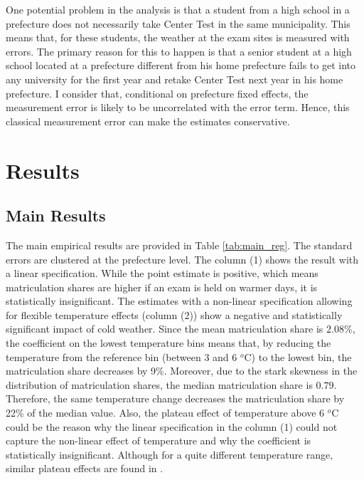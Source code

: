 \documentclass[12pt,letterpaper]{article}
\begin{document}
One potential problem in the analysis is that a student from a high school in a prefecture does not necessarily take Center Test in the same municipality.
This means that, for these students, the weather at the exam sites is measured with errors.
The primary reason for this to happen is that a senior student at a high school located at a prefecture different from his home prefecture fails to get into any university for the first year and retake Center Test next year in his home prefecture.
I consider that, conditional on prefecture fixed effects, the measurement error is likely to be uncorrelated with the error term.
Hence, this classical measurement error can make the estimates conservative.


\section{Results}\label{sec:results}

\subsection{Main Results}

The main empirical results are provided in Table \ref{tab:main_reg}.
The standard errors are clustered at the prefecture level.
The column (1) shows the result with a linear specification.
While the point estimate is positive, which means matriculation shares are higher if an exam is held on warmer days, it is statistically insignificant. 
The estimates with a non-linear specification allowing for flexible temperature effects (column (2)) show a negative and statistically significant impact of cold weather. 
Since the mean matriculation share is $2.08$\%, the coefficient on the lowest temperature bins means that, by reducing the temperature from the reference bin (between 3 and 6 $^o$C) to the lowest bin, the matriculation share decreases by 9\%.
Moreover, due to the stark skewness in the distribution of matriculation shares, the median matriculation share is $0.79$.
Therefore, the same temperature change decreases the matriculation share by 22\% of the median value.
Also, the plateau effect of temperature above 6 $^o$C could be the reason why the linear specification in the column (1) could not capture the non-linear effect of temperature and why the coefficient is statistically insignificant.
Although for a quite different temperature range, similar plateau effects are found in \citet{Park2020a}.
\end{document}
